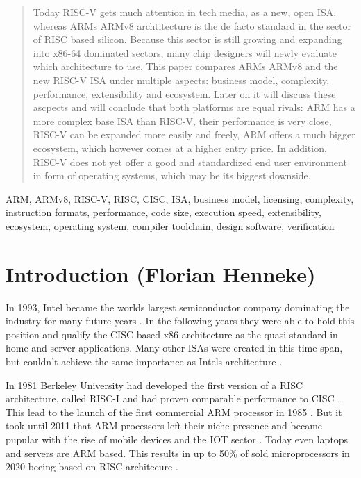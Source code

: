 \documentclass[conference]{IEEEtran}
\begin{document}
\renewcommand{\abstractname}{Abstract (Florian Henneke)}
\begin{abstract}
	Today RISC-V gets much attention in tech media, as a new, open \gls{ISA}, whereas ARMs ARMv8 archtitecture is the de facto standard in the sector of \gls{RISC} based silicon. Because this sector is still growing and expanding into x86-64 dominated sectors, many chip designers will newly evaluate which architecture to use. This paper compares ARMs ARMv8 and the new RISC-V \gls{ISA} under multiple aspects: business model, complexity, performance, extensibility and ecosystem. Later on it will discuss these ascpects and will conclude that both platforms are equal rivals: ARM has a more complex base \gls{ISA} than RISC-V, their performance is very close, RISC-V can be expanded more easily and freely, ARM offers a much bigger ecosystem, which however comes at a higher entry price. In addition, RISC-V does not yet offer a good and standardized end user environment in form of operating systems, which may be its biggest downside.
\end{abstract}

\begin{IEEEkeywords}
ARM, ARMv8, RISC-V, RISC, CISC, ISA, business model, licensing, complexity, instruction formats, performance, code size, execution speed, extensibility, ecosystem, operating system, compiler toolchain, design software, verification
\end{IEEEkeywords}

\section{Introduction (Florian Henneke)}
\label{ref:introduction}
	In 1993, Intel became the worlds largest semiconductor company \cite{ICInsights2011} dominating the industry for many future years \cite{Blem2013}. In the following years they were able to hold this position and qualify the \gls{CISC} based x86 architecture as the quasi standard in home and server applications. Many other \glspl{ISA} were created in this time span, but couldn't achieve the same importance as Intels architecture \cite[page 3-14]{Waterman2016}. 
	
	In 1981 Berkeley University had developed the first version of a \gls{RISC} architecture, called RISC-I and had proven comparable performance to \gls{CISC} \cite[page 2f]{Ryzhyk2006}. This lead to the launch of the first commercial ARM processor in 1985 \cite[page 2f]{Ryzhyk2006}. But it took until 2011 that ARM processors left their niche presence and became pupular with the rise of mobile devices and the IOT sector \cite[Qualcomm representing the rise of ARM silicon]{ICInsights2011a}\cite{ICInsights2012}. Today even laptops \cite{Apple2020} and servers \cite{ARMN1} are ARM based. This results in up to 50\% of sold microprocessors in 2020 beeing based on RISC architecure \cite{ICInsights2020}.
\end{document}
